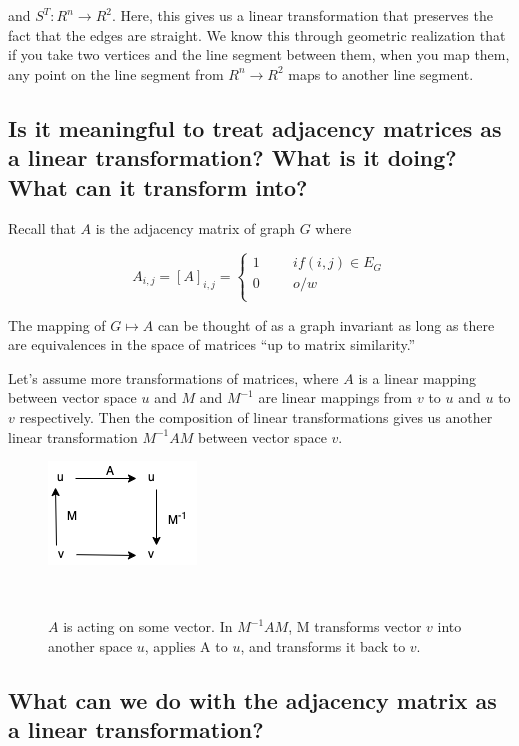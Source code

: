 \documentclass{article}
\begin{document}
    and $S^T: R^n \rightarrow R^2$. Here, this gives us a linear transformation that preserves the fact that the edges are straight. We know this through geometric realization that if you take two vertices and the line segment between them, when you map them, any point on the line segment from $R^n \rightarrow R^2$ maps to another line segment.

    \subsection{Is it meaningful to treat adjacency matrices as a linear transformation? What is it doing? What can it transform into?}
    
    Recall that $A$ is the adjacency matrix of graph $G$ where
    
    $$A_{i,j} = [A]_{i,j} =
        \left\{
            \begin{array}{ll}
                1\hspace{1cm} if(i,j) \in E_G\\
                0\hspace{1cm} o/w\\
            \end{array}
        \right.$$

The mapping of $G\longmapsto A$ can be thought of as a graph invariant as long as there are equivalences in the space of matrices ``up to matrix similarity.''

Let's assume more transformations of matrices, where $A$ is a linear mapping between vector space $u$ and $M$ and $M^{-1}$ are linear mappings from $v$ to $u$ and $u$ to $v$ respectively. Then the composition of linear transformations gives us another linear transformation $M^{-1}AM$ between vector space $v$.  

\begin{figure}[H]
\centering
  \includegraphics[width=0.2\columnwidth]{Images/p1.png}
  \caption{$A$ is acting on some vector. In $M^{-1}AM$, M transforms vector $v$ into another space $u$, applies A to $u$, and transforms it back to $v$.   }~\label{fig:figure1}
\end{figure}

\subsection{What can we do with the adjacency matrix as a linear transformation?}
\end{document}
